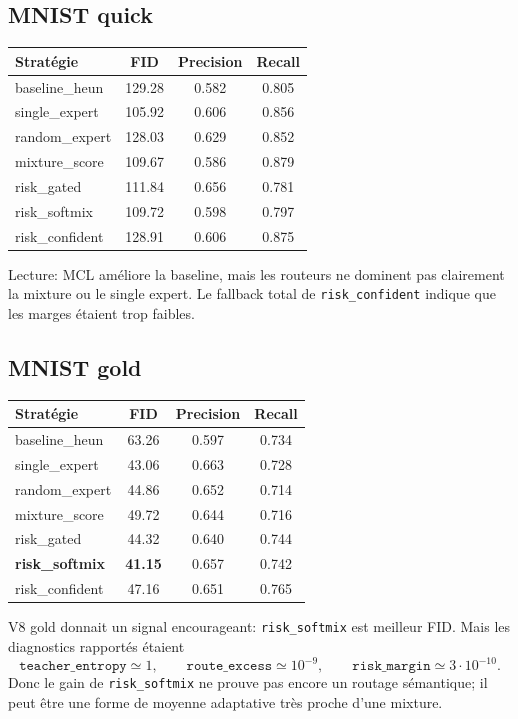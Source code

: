 \documentclass[11pt,a4paper]{article}
\newcommand{\1}{\mathbf{1}}
\begin{document}
\subsection{MNIST quick}

\begin{center}
\begin{tabular}{lccc}
\toprule
Stratégie & FID & Precision & Recall\\
\midrule
baseline\_heun & 129.28 & 0.582 & 0.805\\
single\_expert & 105.92 & 0.606 & 0.856\\
random\_expert & 128.03 & 0.629 & 0.852\\
mixture\_score & 109.67 & 0.586 & 0.879\\
risk\_gated & 111.84 & 0.656 & 0.781\\
risk\_softmix & 109.72 & 0.598 & 0.797\\
risk\_confident & 128.91 & 0.606 & 0.875\\
\bottomrule
\end{tabular}
\end{center}

Lecture: MCL améliore la baseline, mais les routeurs ne dominent pas clairement la mixture ou le single expert. Le fallback total de \texttt{risk\_confident} indique que les marges étaient trop faibles.

\subsection{MNIST gold}

\begin{center}
\begin{tabular}{lccc}
\toprule
Stratégie & FID & Precision & Recall\\
\midrule
baseline\_heun & 63.26 & 0.597 & 0.734\\
single\_expert & 43.06 & 0.663 & 0.728\\
random\_expert & 44.86 & 0.652 & 0.714\\
mixture\_score & 49.72 & 0.644 & 0.716\\
risk\_gated & 44.32 & 0.640 & 0.744\\
\textbf{risk\_softmix} & \textbf{41.15} & 0.657 & 0.742\\
risk\_confident & 47.16 & 0.651 & 0.765\\
\bottomrule
\end{tabular}
\end{center}

V8 gold donnait un signal encourageant: \texttt{risk\_softmix} est meilleur FID. Mais les diagnostics rapportés étaient
\[
\texttt{teacher\_entropy}\simeq 1,
\qquad
\texttt{route\_excess}\simeq 10^{-9},
\qquad
\texttt{risk\_margin}\simeq 3\cdot10^{-10}.
\]
Donc le gain de \texttt{risk\_softmix} ne prouve pas encore un routage sémantique; il peut être une forme de moyenne adaptative très proche d'une mixture.
\end{document}

